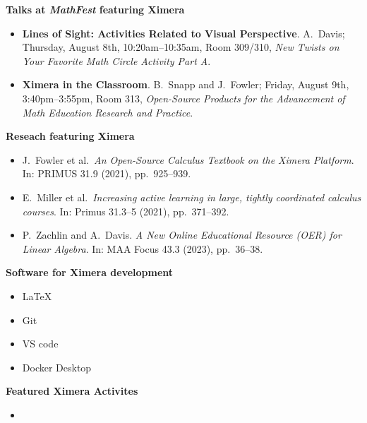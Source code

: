 \documentclass{article}
\begin{document}
\break{}\pagestyle{main}
\begin{multicols}{2}
    \begin{xframe}
        {\sffamily\bfseries Talks at \textsl{MathFest} featuring Ximera}
        \begin{itemize}
            \item[{[1]}] \textbf{Lines of Sight: Activities Related to Visual
                Perspective}. A.\ Davis; Thursday, August 8th,
            10:20am--10:35am,
            Room 309/310,
            \textit{New Twists on Your Favorite Math Circle Activity Part A}.
            \item[{[2]}] \textbf{Ximera in the Classroom}. B.\ Snapp and J.\
            Fowler;
            Friday, August 9th, 3:40pm--3:55pm, Room 313, \textit{Open-Source
                Products for
                the Advancement of Math Education Research and Practice}.
        \end{itemize}
    \end{xframe}
    \begin{xframe}
        {\sffamily\bfseries Reseach featuring Ximera}
        \begin{itemize}
            \item[{[3]}] J.\ Fowler et al.\ \textit{An Open-Source Calculus
                Textbook on the Ximera Platform}. In:
            PRIMUS 31.9 (2021), pp.\ 925--939. %
            \item[{[4]}] E.\ Miller et al.\ \textit{Increasing active learning
                in large, tightly coordinated
                calculus courses}.
            In: Primus 31.3--5 (2021), pp.\ 371--392.
            \item[{[5]}] P.\ Zachlin and A.\ Davis. \textit{A New Online
                Educational Resource (OER)
                for Linear Algebra}. In: MAA Focus 43.3 (2023), pp.\ 36--38.
        \end{itemize}
    \end{xframe}

    \begin{xframe}
        {\sffamily\bfseries Software for Ximera development}
        \begin{itemize}
            \item \LaTeX\
            \item Git
            \item VS code
            \item Docker Desktop
        \end{itemize}
    \end{xframe}


\begin{xframe}
        {\sffamily\bfseries Featured Ximera Activites}
        \begin{itemize}
            \item 
        \end{itemize}
    \end{xframe}



\end{multicols}
\end{document}
